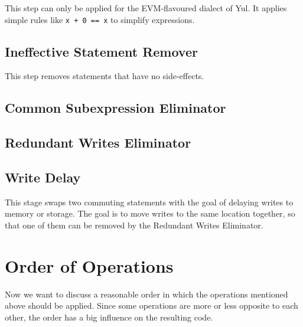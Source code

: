 \documentclass[11pt,letterpaper]{article}
\begin{document}
This step can only be applied for the EVM-flavoured dialect of Yul. It applies
simple rules like \verb|x + 0 == x| to simplify expressions.

\subsection{Ineffective Statement Remover}

This step removes statements that have no side-effects.

\subsection{Common Subexpression Eliminator}

\subsection{Redundant Writes Eliminator}

\subsection{Write Delay}

This stage swaps two commuting statements with the goal of delaying writes to
memory or storage. The goal is to move writes to the same location together,
so that one of them can be removed by the Redundant Writes Eliminator.


\section{Order of Operations}

Now we want to discuss a reasonable order in which
the operations mentioned above should be applied.
Since some operations are more or less opposite to each other,
the order has a big influence on the resulting code.
\end{document}

